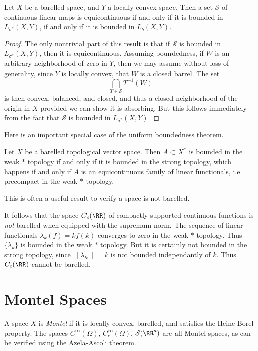 \begin{theorem}
    Let $X$ be a barelled space, and $Y$ a locally convex space. Then a set $\mathcal{S}$ of continuous linear maps is equicontinuous if and only if it is bounded in $L_{\sigma^*}(X,Y)$, if and only if it is bounded in $L_b(X,Y)$.
\end{theorem}
\begin{proof}
    The only nontrivial part of this result is that if $\mathcal{S}$ is bounded in $L_{\sigma^*}(X,Y)$, then it is equicontinuous. Assuming boundedness, if $W$ is an arbitrary neighborhood of zero in $Y$, then we may assume without loss of generality, since $Y$ is locally convex, that $W$ is a closed barrel. The set
    \[ \bigcap_{T \in \mathcal{S}} T^{-1}(W) \]
    is then convex, balanced, and closed, and thus a closed neighborhood of the origin in $X$ provided we can show it is absorbing. But this follows immediately from the fact that $\mathcal{S}$ is bounded in $L_{\sigma^*}(X,Y)$.
\end{proof}

Here is an important special case of the uniform boundedness theorem.

\begin{theorem}
    Let $X$ be a barelled topological vector space. Then $A \subset X^*$ is bounded in the weak $*$ topology if and only if it is bounded in the strong topology, which happens if and only if $A$ is an equicontinuous family of linear functionals, i.e. precompact in the weak $*$ topology.
\end{theorem}

This is often a useful result to verify a space is not barelled.

\begin{example}
    It follows that the space $C_c(\RR)$ of compactly supported continuous functions is \emph{not} barelled when equipped with the supremum norm. The sequence of linear functionals $\lambda_k(f) = k f(k)$ converges to zero in the weak $*$ topology. Thus $\{ \lambda_k \}$ is bounded in the weak $*$ topology. But it is certainly not bounded in the strong topology, since $\| \lambda_k \| = k$ is not bounded independantly of $k$. Thus $C_c(\RR)$ cannot be barelled.
\end{example}

\section{Montel Spaces}

A space $X$ is \emph{Montel} if it is locally convex, barelled, and satisfies the Heine-Borel property. The spaces $C^\infty(\Omega)$, $C_c^\infty(\Omega)$, $\mathcal{S}(\RR^d)$ are all Montel spaces, as can be verified using the Azela-Ascoli theorem.

